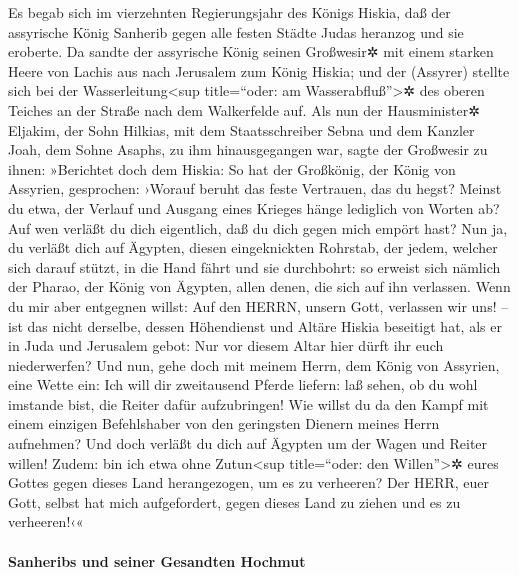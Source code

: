 Es begab sich im vierzehnten Regierungsjahr des Königs
Hiskia, daß der assyrische König Sanherib gegen alle festen Städte Judas
heranzog und sie eroberte. Da sandte der assyrische König
seinen Großwesir✲ mit einem starken Heere von Lachis aus nach Jerusalem
zum König Hiskia; und der (Assyrer) stellte sich bei der
Wasserleitung\textless sup title=``oder: am Wasserabfluß''\textgreater✲
des oberen Teiches an der Straße nach dem Walkerfelde auf.
Als nun der Hausminister✲ Eljakim, der Sohn Hilkias, mit
dem Staatsschreiber Sebna und dem Kanzler Joah, dem Sohne Asaphs, zu ihm
hinausgegangen war, sagte der Großwesir zu ihnen:
»Berichtet doch dem Hiskia: So hat der Großkönig, der König von
Assyrien, gesprochen: ›Worauf beruht das feste Vertrauen, das du hegst?
Meinst du etwa, der Verlauf und Ausgang eines Krieges
hänge lediglich von Worten ab? Auf wen verläßt du dich eigentlich, daß
du dich gegen mich empört hast? Nun ja, du verläßt dich
auf Ägypten, diesen eingeknickten Rohrstab, der jedem, welcher sich
darauf stützt, in die Hand fährt und sie durchbohrt: so erweist sich
nämlich der Pharao, der König von Ägypten, allen denen, die sich auf ihn
verlassen. Wenn du mir aber entgegnen willst: Auf den
HERRN, unsern Gott, verlassen wir uns! -- ist das nicht derselbe, dessen
Höhendienst und Altäre Hiskia beseitigt hat, als er in Juda und
Jerusalem gebot: Nur vor diesem Altar hier dürft ihr euch niederwerfen?
Und nun, gehe doch mit meinem Herrn, dem König von
Assyrien, eine Wette ein: Ich will dir zweitausend Pferde liefern: laß
sehen, ob du wohl imstande bist, die Reiter dafür aufzubringen!
Wie willst du da den Kampf mit einem einzigen Befehlshaber
von den geringsten Dienern meines Herrn aufnehmen? Und doch verläßt du
dich auf Ägypten um der Wagen und Reiter willen! Zudem:
bin ich etwa ohne Zutun\textless sup title=``oder: den
Willen''\textgreater✲ eures Gottes gegen dieses Land herangezogen, um es
zu verheeren? Der HERR, euer Gott, selbst hat mich aufgefordert, gegen
dieses Land zu ziehen und es zu verheeren!‹«

\hypertarget{sanheribs-und-seiner-gesandten-hochmut}{%
\paragraph{Sanheribs und seiner Gesandten
Hochmut}\label{sanheribs-und-seiner-gesandten-hochmut}}

